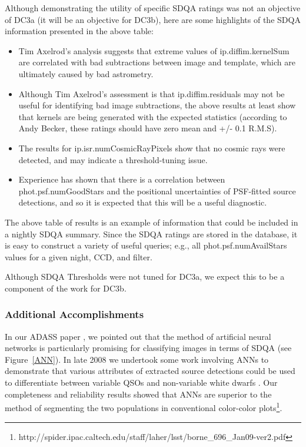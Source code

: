 Although demonstrating the utility of specific SDQA ratings was not an objective of DC3a (it will
be an objective for DC3b), here are some highlights of the SDQA information presented in the 
above table:

\begin{itemize}
\item{Tim Axelrod's analysis suggests that extreme values of ip.diffim.kernelSum are correlated
with bad subtractions between image and template, which are ultimately caused by bad astrometry.}
\item{Although Tim Axelrod's assessment is that ip.diffim.residuals may not be useful for identifying
bad image subtractions, the above results at least show that kernels are being generated with the
expected statistics (according to Andy Becker, these ratings should have zero mean and +/- 0.1 R.M.S).}
\item{The results for ip.isr.numCosmicRayPixels show that no cosmic rays were detected, and 
may indicate a threshold-tuning issue.}
\item{Experience has shown that there is a correlation between phot.psf.numGoodStars and the 
positional uncertainties of PSF-fitted source detections, and so it is expected that this will be
a useful diagnostic.}
\end{itemize}

The above table of results is an example of information that could be included in a 
nightly SDQA summary.  Since the SDQA ratings are stored in the database, it is easy to
construct a variety of useful queries; e.g., all phot.psf.numAvailStars values for a given night,
CCD, and filter.

Although SDQA Thresholds were not tuned for DC3a, we expect this to be a component of the
work for DC3b.


\subsubsection{Additional Accomplishments}

In our ADASS paper \citet{laher08}, we pointed out that the method of 
artificial neural networks is particularly promising for classifying images in 
terms of SDQA (see Figure~\ref{ANN}).  In late 2008 we undertook some work 
involving ANNs to demonstrate that various attributes of extracted source detections 
could be used to differentiate between variable QSOs and non-variable white dwarfs 
\citet{borne09}.  Our completeness and reliability results showed that ANNs 
are superior to the method of segmenting the two populations in conventional 
color-color plots\footnote{
http://spider.ipac.caltech.edu/staff/laher/lsst/borne\_696\_Jan09-ver2.pdf
}.

